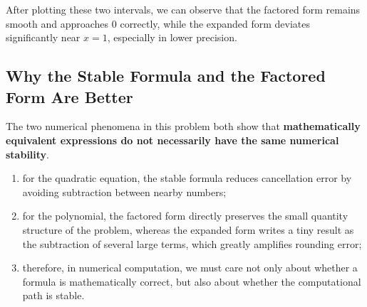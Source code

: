 \documentclass[12pt,a4paper]{article}
\begin{document}
After plotting these two intervals, we can observe that the factored form remains smooth and approaches 0 correctly, while the expanded form deviates significantly near $x=1$, especially in lower precision.

\subsection*{Why the Stable Formula and the Factored Form Are Better}

The two numerical phenomena in this problem both show that \textbf{mathematically equivalent expressions do not necessarily have the same numerical stability}.

\begin{enumerate}[label=\arabic*)]
    \item for the quadratic equation, the stable formula reduces cancellation error by avoiding subtraction between nearby numbers;
    \item for the polynomial, the factored form directly preserves the small quantity structure of the problem, whereas the expanded form writes a tiny result as the subtraction of several large terms, which greatly amplifies rounding error;
    \item therefore, in numerical computation, we must care not only about whether a formula is mathematically correct, but also about whether the computational path is stable.
\end{enumerate}
\end{document}
